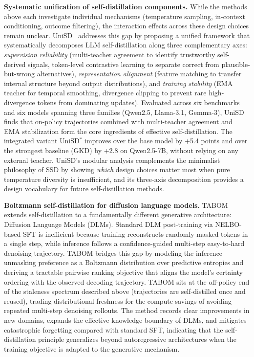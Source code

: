 \documentclass{article} %
\begin{document}
\textbf{Systematic unification of self-distillation components.} While the methods above each investigate individual mechanisms (temperature sampling, in-context conditioning, outcome filtering), the interaction effects across these design choices remain unclear. UniSD~\citep{2605.06597} addresses this gap by proposing a unified framework that systematically decomposes LLM self-distillation along three complementary axes: \emph{supervision reliability} (multi-teacher agreement to identify trustworthy self-derived signals, token-level contrastive learning to separate correct from plausible-but-wrong alternatives), \emph{representation alignment} (feature matching to transfer internal structure beyond output distributions), and \emph{training stability} (EMA teacher for temporal smoothing, divergence clipping to prevent rare high-divergence tokens from dominating updates). Evaluated across six benchmarks and six models spanning three families (Qwen2.5, Llama-3.1, Gemma-3), UniSD finds that on-policy trajectories combined with multi-teacher agreement and EMA stabilization form the core ingredients of effective self-distillation. The integrated variant UniSD$^*$ improves over the base model by +5.4 points and over the strongest baseline (GKD) by +2.8 on Qwen2.5-7B, without relying on any external teacher. UniSD's modular analysis complements the minimalist philosophy of SSD by showing \emph{which} design choices matter most when pure temperature diversity is insufficient, and its three-axis decomposition provides a design vocabulary for future self-distillation methods.

\textbf{Boltzmann self-distillation for diffusion language models.} TABOM~\citep{2605.11854} extends self-distillation to a fundamentally different generative architecture: Diffusion Language Models (DLMs). Standard DLM post-training via NELBO-based SFT is inefficient because training reconstructs randomly masked tokens in a single step, while inference follows a confidence-guided multi-step easy-to-hard denoising trajectory. TABOM bridges this gap by modeling the inference unmasking preference as a Boltzmann distribution over predictive entropies and deriving a tractable pairwise ranking objective that aligns the model's certainty ordering with the observed decoding trajectory. TABOM sits at the off-policy end of the staleness spectrum described above (trajectories are self-distilled once and reused), trading distributional freshness for the compute savings of avoiding repeated multi-step denoising rollouts. The method records clear improvements in new domains, expands the effective knowledge boundary of DLMs, and mitigates catastrophic forgetting compared with standard SFT, indicating that the self-distillation principle generalizes beyond autoregressive architectures when the training objective is adapted to the generative mechanism.
\end{document}
